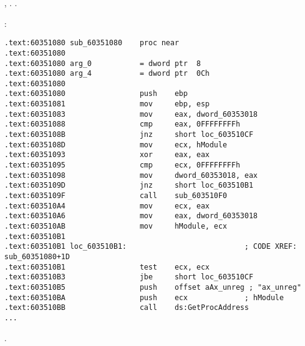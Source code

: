 ,  . 
 .

:

\begin{lstlisting}
.text:60351080 sub_60351080    proc near
.text:60351080
.text:60351080 arg_0           = dword ptr  8
.text:60351080 arg_4           = dword ptr  0Ch
.text:60351080
.text:60351080                 push    ebp
.text:60351081                 mov     ebp, esp
.text:60351083                 mov     eax, dword_60353018
.text:60351088                 cmp     eax, 0FFFFFFFFh
.text:6035108B                 jnz     short loc_603510CF
.text:6035108D                 mov     ecx, hModule
.text:60351093                 xor     eax, eax
.text:60351095                 cmp     ecx, 0FFFFFFFFh
.text:60351098                 mov     dword_60353018, eax
.text:6035109D                 jnz     short loc_603510B1
.text:6035109F                 call    sub_603510F0
.text:603510A4                 mov     ecx, eax
.text:603510A6                 mov     eax, dword_60353018
.text:603510AB                 mov     hModule, ecx
.text:603510B1
.text:603510B1 loc_603510B1:                           ; CODE XREF: sub_60351080+1D
.text:603510B1                 test    ecx, ecx
.text:603510B3                 jbe     short loc_603510CF
.text:603510B5                 push    offset aAx_unreg ; "ax_unreg"
.text:603510BA                 push    ecx             ; hModule
.text:603510BB                 call    ds:GetProcAddress
...
\end{lstlisting}

.

